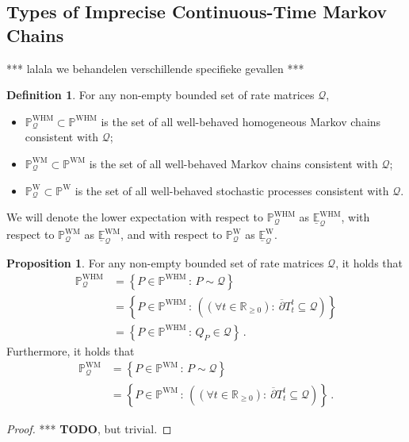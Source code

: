 \documentclass[10pt]{paper}
\theoremstyle{definition}
\newtheorem{proposition}[theorem]{Proposition}
\newtheorem{definition}{Definition}
\newcommand{\reals}{\mathbb{R}}
\newcommand{\realsnonneg}{\reals_{\geq 0}}
\newcommand{\processes}{\mathbb{P}}
\newcommand{\wprocesses}{\processes^{\mathrm{W}}}
\newcommand{\wmprocesses}{\processes^{\mathrm{WM}}}
\newcommand{\whmprocesses}{\processes^{\mathrm{WHM}}}
\newcommand{\rateset}{\mathcal{Q}}
\begin{document}
\subsection{Types of Imprecise Continuous-Time Markov Chains}

*** lalala we behandelen verschillende specifieke gevallen ***

\begin{definition}\label{def:process_sets}
For any non-empty bounded set of rate matrices $\rateset$,
\begin{itemize}
\item $\whmprocesses_\rateset\subset\whmprocesses$ is the set of all well-behaved homogeneous Markov chains consistent with $\rateset$;
\item $\wmprocesses_\rateset\subset\wmprocesses$ is the set of all well-behaved Markov chains consistent with $\rateset$;
\item $\wprocesses_\rateset\subset\wprocesses$ is the set of all well-behaved stochastic processes consistent with $\rateset$.
\end{itemize}
We will denote the lower expectation with respect to $\whmprocesses_\rateset$ as $\underline{\mathbb{E}}_\rateset^{\mathrm{WHM}}$, with respect to $\wmprocesses_\rateset$ as $\underline{\mathbb{E}}_\rateset^{\mathrm{WM}}$, and with respect to $\wprocesses_\rateset$ as $\underline{\mathbb{E}}_\rateset^{\mathrm{W}}$.
\end{definition}

\begin{proposition}\label{prop:process_sets_simplify}
For any non-empty bounded set of rate matrices $\rateset$, it holds that
\begin{align*}
\whmprocesses_\rateset &= \left\{P\in\whmprocesses\,:\,P\sim\rateset\right\} \\
 &= \left\{P\in\whmprocesses\,:\,\left((\forall t\in\realsnonneg):~
\overline{\partial}
{T^t_{t}}\subseteq\rateset
\right) \right\} \\
 &= \left\{P\in\whmprocesses\,:\,Q_P\in\rateset\right\}\,.
\end{align*}
Furthermore, it holds that
\begin{align*}
\wmprocesses_\rateset &= \left\{P\in\wmprocesses\,:\,P\sim\rateset\right\} \\
 &= \left\{P\in\wmprocesses\,:\,\left((\forall t\in\realsnonneg):~
\overline{\partial}
{T^t_{t}}\subseteq\rateset
\right) \right\}\,.
\end{align*}
\end{proposition}
\begin{proof}
*** {\bf TODO}, but trivial.
\end{proof}
\end{document}
